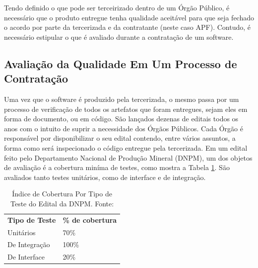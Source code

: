 Tendo definido o que pode ser terceirizado dentro de um Órgão Público, é necessário que o produto entregue tenha qualidade aceitável para que seja fechado o acordo por parte da tercerizada e da contratante (neste caso APF). Contudo, é necessário estipular o que é avaliado durante a contratação de um software.

\subsection{Avaliação da Qualidade Em Um Processo de Contratação }
Uma vez que o software é produzido pela tercerizada, o mesmo passa por um processo de verificação de todos os artefatos que foram entregues, sejam eles em forma de documento, ou em código. São lançados dezenas de editais todos os anos com o intuito de suprir a necessidade dos Órgãos Públicos. Cada Órgão é responsável por disponibilizar o seu edital contendo, entre vários assuntos, a forma como será inspecionado o código entregue pela tercerizada. Em um edital feito pelo Departamento Nacional de Produção Mineral (DNPM)\cite{edital}, um dos objetos de avaliação é a cobertura miníma de testes, como mostra a Tabela \ref{tabela1}. São avaliados tanto testes unitários, como de interface e de integração.

\begin{table}[h!]
\centering
\caption{Índice de Cobertura Por Tipo de Teste do Edital da DNPM. Fonte:\cite{edital}}
\label{tabela1}
\begin{tabular}{ll}
\textbf{Tipo de Teste} & \textbf{\% de cobertura} \\
Unitários              & 70\%                     \\
De Integração          & 100\%                    \\
De Interface           & 20\%                    
\end{tabular}
\end{table}



